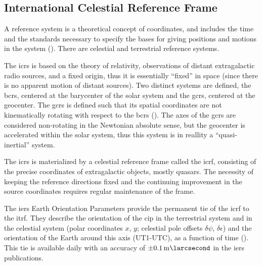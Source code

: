 \subsection{International Celestial Reference Frame}\label{ssec:icrf}

A reference system is a theoretical concept of coordinates, and includes the time
and the standards necessary to specify the bases for giving positions and motions
in the system (\cite{Gurfil2018}). There are celestial and terrestrial reference systems.

The \gls{icrs} is based on the theory of relativity, observations of distant 
extragalactic radio sources, and a fixed origin, thus it is essentially ``fixed'' 
in space (since there is no apparent motion of distant sources). Two distinct 
systems are defined, the \gls{bcrs}, centered at the barycenter of the solar 
system and the \gls{gcrs}, centered at the geocenter. The \gls{gcrs} is defined 
such that its spatial coordinates are not kinematically rotating with respect 
to the \gls{bcrs} (\cite{Gurfil2018}). The axes of the \gls{gcrs} are considered 
non-rotating in the Newtonian absolute sense, but the geocenter is accelerated 
within the solar system, thus this system is in reallity a ``quasi-inertial'' 
system.

The \gls{icrs} is materialized by a celestial reference frame called the \gls{icrf}, 
consisting of the precise coordinates of extragalactic objects, mostly quasars. The 
necessity of keeping the reference directions fixed and the continuing improvement 
in the source coordinates requires regular maintenance of the frame.

The \gls{iers} Earth Orientation Parameters provide the permanent tie of the \gls{icrf}
to the \gls{itrf}. They describe the orientation of the \gls{cip}
in the terrestrial system and in the celestial system (polar coordinates $x$,
$y$; celestial pole offsets $\delta \psi$, $\delta \epsilon$) and the orientation 
of the Earth around this axis (UT1-UTC), as a function of time (\cite{iers2010}). 
This tie is available daily with an accuracy of $\pm\SI{0.1}{\milli\larcsecond}$ in the 
\gls{iers} publications.
